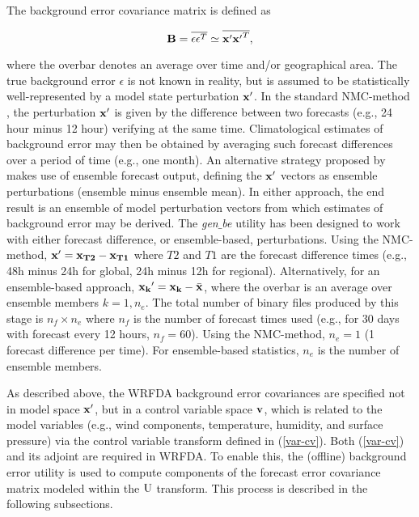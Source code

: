 The background error covariance matrix is defined as 

\begin{equation}
{\bf B}=\overline{\epsilon \epsilon^{T}} \simeq \overline{{\bf x'}{\bf x'}^{T}},
\label{var-b}
\end{equation}

\noindent where the overbar denotes an average over time and/or geographical area. The true 
background error $\epsilon$ is not known in reality, but is assumed to be statistically
well-represented by a model state perturbation ${\bf x'}$. In the standard NMC-method
\citep{parrish92}, the perturbation ${\bf x'}$ is given by the difference between 
two forecasts (e.g., 24 hour minus 12 hour) verifying at the same time. Climatological 
estimates of background error may then be obtained by averaging such forecast 
differences over a period of time (e.g., one month). An alternative strategy proposed by 
\citep{fisher03} makes use of ensemble forecast output, defining the ${\bf x'}$ vectors as 
ensemble perturbations (ensemble minus ensemble mean). In either approach, the end 
result is an ensemble of model perturbation vectors from which estimates of 
background error may be derived. The {\it gen$\_$be} utility has been designed to work with 
either forecast difference, or ensemble-based, perturbations.
Using the NMC-method, ${\bf x}'={\bf x_{T2}}-{\bf x_{T1}}$ where $T2$ and $T1$ 
are the forecast difference times (e.g., 48h minus 24h for global, 24h minus 12h for regional). 
Alternatively, for an ensemble-based approach, ${\bf x_{k}}'={\bf x_{k}}-\bar{\bf 
x}$, where the overbar is an average over ensemble members $k=1,n_{e}$. The total 
number of binary files produced by this stage is $n_{f} \times n_e$ where $n_f$ is the 
number of forecast times used (e.g., for 30 days with forecast every 12 hours, $n_f=60$). 
Using the NMC-method, $n_e=1$ (1 forecast difference per time). For ensemble-based 
statistics, $n_e$ is the number of ensemble members.

As described above, the WRFDA background error covariances are specified not in 
model space ${\bf x'}$, but in a control variable space ${\bf v}$, which is related to the model variables 
(e.g., wind components, temperature, humidity, and surface pressure) via the control 
variable transform defined in (\ref{var-cv}). Both (\ref{var-cv}) and 
its adjoint are required in WRFDA. To enable this, the (offline) background error utility is used
to compute components of the forecast error covariance matrix modeled within the 
${\rm U}$ transform. This process is described in the following subsections.

